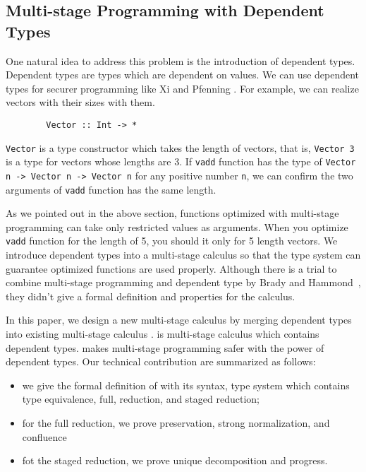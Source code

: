 \subsection{Multi-stage Programming with Dependent Types}


One natural idea to address this problem is the introduction of dependent types.
Dependent types are types which are dependent on values.
We can use dependent types for securer programming like Xi and Pfenning \cite{Xi98}.
For example, we can realize vectors with their sizes with them.
\begin{verbatim}
        Vector :: Int -> *
\end{verbatim}
\verb|Vector| is a type constructor which takes the length of vectors, that is, 
\verb|Vector 3| is a type for vectors whose lengths are 3.
If \verb|vadd| function has the type of \verb|Vector n -> Vector n -> Vector n| for any positive number \verb|n|,
we can confirm the two arguments of \verb|vadd| function has the same length.

As we pointed out in the above section,
functions optimized with multi-stage programming can take only restricted values as arguments.
When you optimize \verb|vadd| function for the length of 5, you should it only for 5 length vectors.
We introduce dependent types into a multi-stage calculus
so that the type system can guarantee optimized functions are used properly.
Although there is a trial to combine multi-stage programming and dependent type by Brady and Hammond~\cite{brady2006dependently},
they didn't give a formal definition and properties for the calculus.

In this paper, we design a new multi-stage calculus \LMD by 
merging dependent types into existing multi-stage calculus \LTP\cite{Hanada2014}.
\LMD is multi-stage calculus which contains dependent types.
\LMD makes multi-stage programming safer with the power of dependent types.
Our technical contribution are summarized as follows:
\begin{itemize}
        \item we give the formal definition of \LMD with its syntax, 
        type system which contains type equivalence, full, reduction, and staged reduction;
        \item for the full reduction, we prove preservation, strong normalization, and confluence
        \item fot the staged reduction, we prove unique decomposition and progress.
\end{itemize}

